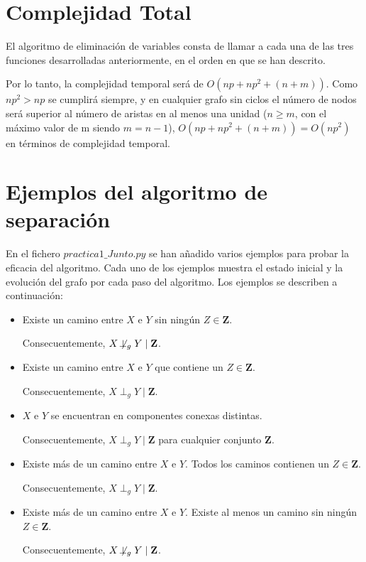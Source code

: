 \documentclass[a4paper,12pt]{article}
\newcommand{\notperpg}{\mathrel{\not\!\perp_g}}
\begin{document}
\section{Complejidad Total}
El algoritmo de eliminación de variables consta de llamar a cada una de las tres funciones desarrolladas anteriormente, en el orden en que se han descrito.

Por lo tanto, la complejidad temporal será de $O(np+np^2+(n+m))$. Como $np^2 > np$ se cumplirá siempre, y en cualquier grafo sin ciclos el número de nodos será superior al número de aristas en al menos una unidad ($n \ge m$, con el máximo valor de m siendo $m = n - 1$), $O(np+np^2+(n+m)) = O(np^2)$ en términos de complejidad temporal.

\section{Ejemplos del algoritmo de separación}
En el fichero $practica1\_Junto.py$ se han añadido varios ejemplos para probar la eficacia del algoritmo. Cada uno de los ejemplos muestra el estado inicial y la evolución del grafo por cada paso del algoritmo. Los ejemplos se describen a continuación:

\begin{itemize}
    \item Existe un camino entre $X$ e $Y$ sin ningún $Z \in \textbf{Z}$. 
    
    Consecuentemente, $X \notperpg Y \mid \textbf{Z}$.
    
    \item Existe un camino entre $X$ e $Y$ que contiene un $Z \in \textbf{Z}$.

    Consecuentemente, $X \perp _g Y \mid \textbf{Z}$.
    
    \item $X$ e $Y$ se encuentran en componentes conexas distintas.

    Consecuentemente, $X \perp _g Y \mid \textbf{Z}$ para cualquier conjunto $\textbf{Z}$.

    \item Existe más de un camino entre $X$ e $Y$. Todos los caminos contienen un $Z \in \textbf{Z}$.

    Consecuentemente, $X \perp _g Y \mid \textbf{Z}$.

    \item Existe más de un camino entre $X$ e $Y$. Existe al menos
    un camino sin ningún $Z \in \textbf{Z}$.

    Consecuentemente, $X \notperpg Y \mid \textbf{Z}$.
    
\end{itemize}
\end{document}
